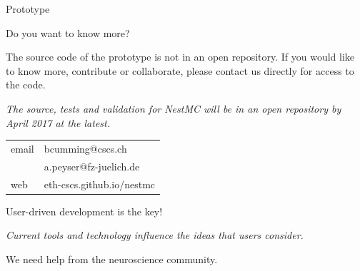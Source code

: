 \documentclass[a0paper,portrait]{baposter}
\newcommand{\newemph}[1]{{\color{blue!40!black}\em #1}}
\begin{document}
\begin{poster}
\begin{posterbox}[name=nestmc,column=0,below=who,span=2]{Prototype}
\end{posterbox}

\begin{posterbox}[name=nestmc,column=0,below=nestmc,span=2]{Do you want to know more?}
\hfill
    \begin{minipage}{0.55\textwidth}
        The source code of the prototype is not in an open repository.
        If you would like to know more, contribute or collaborate, please contact us directly for access to the code.
        \vspace{-13.5pt}
        \begin{center}
            \newemph{The source, tests and validation for NestMC will be in an open repository by April 2017 at the latest.}
        \end{center}
        \vspace{-2.5pt}
    \end{minipage}
\hfill
    \begin{minipage}{0.4\textwidth}
        \colorbox[HTML]{FCF3CF}{%
            \begin{tabularx}{0.9\textwidth}{l|X}
                email & {bcumming@cscs.ch}\\
                      & {a.peyser@fz-juelich.de}\smallskip\\
                web   & {eth-cscs.github.io/nestmc}\smallskip\\
            \end{tabularx}
        }
    \end{minipage}
\hfill

\end{posterbox}


\begin{posterbox}
    [name=help,column=2,row=0,span=1,borderColor=blue!40!black,headerColorOne=blue!40!black,headerFontColor=white]
    {User-driven development is the key!}
        \begin{center}
            \newemph{Current tools and technology influence the ideas that users consider.}

            \vspace{5pt}
        We need help from the neuroscience community.
        \end{center}
            \vspace{-10pt}


\end{posterbox}
\end{poster}
\end{document}
